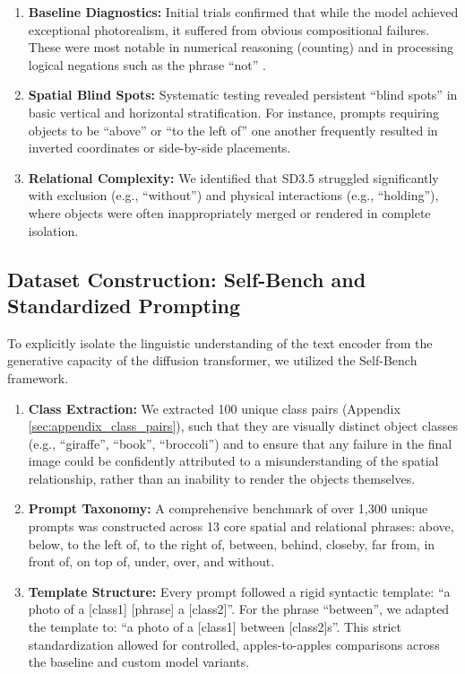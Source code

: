 \begin{enumerate}
    \item \textbf{Baseline Diagnostics:} Initial trials confirmed that while the model achieved exceptional photorealism, it suffered from obvious compositional failures. These were most notable in numerical reasoning (counting) \citep{li2025countdiffusiontexttoimagesynthesistrainingfree, zhao2025demystifyingnumerositydiffusionmodels} and in processing logical negations such as the phrase ``not'' \citep{ban2024understandingimpactnegativeprompts}. 
    \item \textbf{Spatial Blind Spots:} Systematic testing revealed persistent ``blind spots'' in basic vertical and horizontal stratification. For instance, prompts requiring objects to be ``above'' or ``to the left of'' one another frequently resulted in inverted coordinates or side-by-side placements.
    \item \textbf{Relational Complexity:} We identified that SD3.5 struggled significantly with exclusion (e.g., ``without'') and physical interactions (e.g., ``holding''), where objects were often inappropriately merged or rendered in complete isolation.
\end{enumerate}

\subsection{Dataset Construction: Self-Bench and Standardized Prompting}
To explicitly isolate the linguistic understanding of the text encoder from the generative capacity of the diffusion transformer, we utilized the Self-Bench \citep{jeong2025diffusionclassifiersunderstandcompositionality} framework.

\begin{enumerate}
    \item \textbf{Class Extraction:} We extracted 100 unique class pairs (Appendix \ref{sec:appendix_class_pairs}), such that they are visually distinct object classes (e.g., ``giraffe'', ``book'', ``broccoli'') and to ensure that any failure in the final image could be confidently attributed to a misunderstanding of the spatial relationship, rather than an inability to render the objects themselves.
    \item \textbf{Prompt Taxonomy:} A comprehensive benchmark of over 1,300 unique prompts was constructed across 13 core spatial and relational phrases: above, below, to the left of, to the right of, between, behind, closeby, far from, in front of, on top of, under, over, and without.
    \item \textbf{Template Structure:} Every prompt followed a rigid syntactic template: ``a photo of a [class1] [phrase] a [class2]''. For the phrase ``between'', we adapted the template to: ``a photo of a [class1] between [class2]s''. This strict standardization allowed for controlled, apples-to-apples comparisons across the baseline and custom model variants. 
\end{enumerate}

